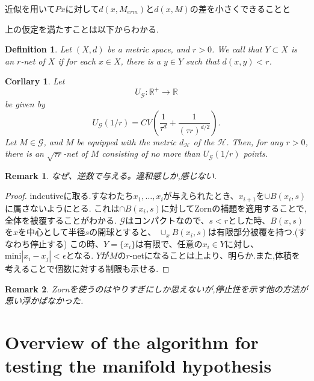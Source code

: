 \documentclass{ujarticle}
\newtheorem{dfn}[thm]{Definition}
\newtheorem{cor}[thm]{Corllary}
\newtheorem*{rem}{Remark}
\begin{document}
近似を用いて$Px$に対して$d(x,M_{erm})$と$d(x,M)$の差を小さくできることと

上の仮定を満たすことは以下からわかる.

\begin{dfn}
 Let $(X,d)$ be a metric space, and $r > 0$. We call that $Y \subset X$ is an $r$-net of $X$
 if   for each $x \in X$, there is a $y \in Y$ such that $d(x,y) < r$.
\end{dfn}

\begin{cor}
\label{volumebound}
   Let
  \begin{equation*}
   U_{\mathcal{G}}:\mathbb{R}^{+} \to \mathbb{R}
  \end{equation*}
be given by
\begin{equation*}
 U_{\mathcal{G}}(1/r) = CV ( \frac{ 1 }{\tau^d }  + \frac{ 1 }{ (\tau r)^{d/2} }).
\end{equation*}
Let $M \in \mathcal{G}$, and $M$ be equipped with the metric $d_{\mathcal{H}}$ of the $\mathcal{H}$.
Then, for any $r >0$, there is an $\sqrt{\tau r}$-net of $M$ consisting of no more than $U_{\mathcal{G}}(1/r)$ points.
\end{cor}
\begin{rem}
 なぜ、逆数で与える。違和感しか,感じない.
\end{rem}

\begin{proof}
  indcutiveに取る.すなわたち$x_1,\dots,x_i$が与えられたとき、$x_{i+1}$を$\cup B(x_i,s)$に属さないようにとる.
  これは$\cap B(x_i,s)$に対してZornの補題を適用することで,全体を被覆することがわかる.
  $\mathcal{G}$はコンパクトなので、$ s < r$とした時、$B(x,s)$を$x$を中心として半径$s$の開球とすると、
  $\cup_x B(x_i,s)$は有限部分被覆を持つ.(すなわち停止する)
  この時、$Y=\{ x_i \}$は有限で、任意の$x_i \in Y$に対し、$\mathrm{mini}|x_ i -x_j| < \epsilon$となる.
  $Y$が$M$の$r$-netになることは上より、明らか.また,体積を考えることで個数に対する制限も示せる.
\end{proof}
\begin{rem}
 Zornを使うのはやりすぎにしか思えないが,停止性を示す他の方法が思い浮かばなかった.
\end{rem}


\section{Overview of the algorithm for testing the manifold hypothesis}
\label{sec:Overview of the algorithm for testing the manifold hypothesis}
\end{document}
